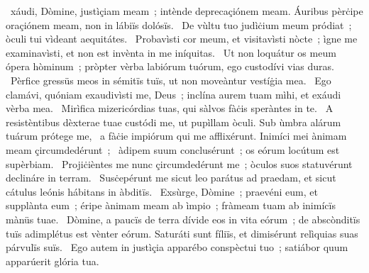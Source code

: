 \psalmChapterWithInscription{}
{ }
{%
~xáudi, Dòmine, justìçiam meam~; intènde deprecaçiónem meam. Áuribus pèrċipe oraçiónem meam, non in lábiïs dolósïs. 
~De vùltu tuo judìċium meum pródiat~; òculi tui vìdeant aequitátes. 
~Probavìsti cor meum, et visitavìsti nòcte~; ìgne me examinavìsti, et non est invènta in me iníquitas. 
~Ut non loquátur os meum ópera hòminum~; pròpter vèrba labiórum tuórum, ego custodívi vias duras. 
~Pèrfice gressüs meos in sémitïs tuïs, ut non moveàntur vestíġia mea. 
~Ego clamávi, quóniam exaudivìsti me, Deus~; inclína aurem tuam mìhi, et exáudi vèrba mea. 
~Mirìfica mizericórdias tuas, qui sàlvos fàċis speràntes in te. 
~A resistèntibus dèxterae tuae custódi me, ut pupìllam òculi. Sub ùmbra alárum tuárum prótege me, 
~a fàċie impiórum qui me afflixérunt. Inimíci mei ànimam meam çircumdedérunt~; 
~àdipem suum conclusérunt~; os eórum locútum est supèrbiam. 
~Projiċièntes me nunc çircumdedérunt me~; òculos suos statuvérunt declináre in terram. 
~Susċepérunt me sicut leo parátus ad praedam, et sicut cátulus leónis hábitans in àbditïs. 
~Exsùrge, Dòmine~; praevéni eum, et supplànta eum~; éripe ànimam meam ab ìmpio~; fràmeam tuam ab inimícïs mànüs tuae. 
~Dòmine, a paucïs de terra dívide eos in vita eórum~; de abscònditïs tuïs adimplétus est vènter eórum. Saturáti sunt fíliïs, et dimisérunt relìquias suas párvulïs suïs. 
~Ego autem in justìçia apparébo conspèctui tuo~; satiábor quum apparúerit glória tua. 
}
